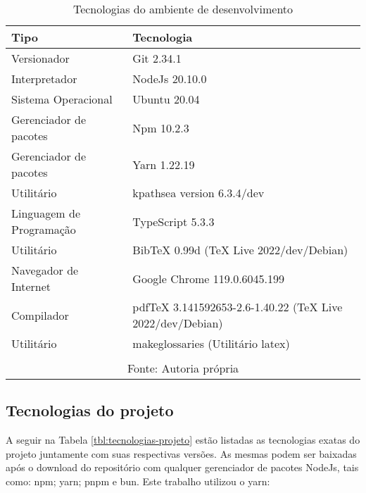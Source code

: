 \begin{table}[H]
    \centering
    \caption{Tecnologias do ambiente de desenvolvimento}
    \label{tbl:tecnologias-ambiente}
    \renewcommand{\arraystretch}{1.5}
    \begin{tabular}{p{6.4000cm} p{9.6000cm}}
        \hline
        \textbf{Tipo} & \textbf{Tecnologia} \\
        \hline
        Versionador & Git 2.34.1 \\
		Interpretador & NodeJs 20.10.0 \\
		Sistema Operacional & Ubuntu 20.04 \\
		Gerenciador de pacotes & Npm 10.2.3 \\
		Gerenciador de pacotes & Yarn 1.22.19 \\
		Utilitário & kpathsea version 6.3.4/dev \\
		Linguagem de Programação & TypeScript 5.3.3 \\
		Utilitário & BibTeX 0.99d (TeX Live 2022/dev/Debian) \\
		Navegador de Internet & Google Chrome 119.0.6045.199 \\
		Compilador & pdfTeX 3.141592653-2.6-1.40.22 (TeX Live 2022/dev/Debian) \\
		Utilitário & makeglossaries (Utilitário \acrshort{latex}) \\
        \hline
        \\\multicolumn{2}{c}{\fontsize{10pt}{12pt}Fonte: Autoria própria}
    \end{tabular}
\end{table}

\subsection{Tecnologias do projeto}

A seguir
na
Tabela \ref{tbl:tecnologias-projeto}
estão listadas as tecnologias exatas do projeto juntamente com
suas respectivas versões. As mesmas podem ser baixadas após o download do
repositório com qualquer gerenciador de pacotes NodeJs, tais como: npm;
yarn; pnpm e bun. Este trabalho utilizou o yarn:

